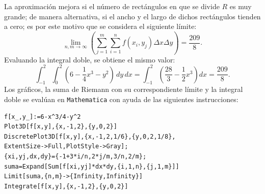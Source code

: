 \begin{ejemplo}
  La aproximación mejora si el número de rectángulos en que se divide $R$ es muy grande; de manera alternativa, si el ancho y el largo de dichos rectángulos tienden a cero; es por este motivo que se considera el siguiente límite:
  \[
    \lim_{n,m\to \infty }\left(\sum_{j=1}^{m}\sum_{i=1}^{n}f\left( x_{i},y_{j}\right) \Delta x\Delta y\right) = \frac{209}{8}.
  \]
  Evaluando la integral doble, se obtiene el mismo valor:
  \[
    \int_{-1}^{2}\int_{0}^{2}\left( 6-\frac{1}{4}x^{3}-y^{2}\right) \,dy\,dx
    =\int_{-1}^{2}\left( \frac{28}{3}-\frac{1}{2}x^{3}\right) dx= \frac{209}{8}.
  \]
  Los gráficos, la suma de Riemann con su correspondiente límite y la integral doble se evalúan en \verb"Mathematica" con ayuda de las siguientes instrucciones:
\end{ejemplo}

\begin{tcolorbox}[title=\bf Instrucción \verb"Mathematica"]\begin{Verbatim}[formatcom=\letraverbatim]
f[x_,y_]:=6-x^3/4-y^2
Plot3D[f[x,y],{x,-1,2},{y,0,2}]
DiscretePlot3D[f[x,y],{x,-1,2,1/6},{y,0,2,1/8},
ExtentSize->Full,PlotStyle->Gray];
{xi,yj,dx,dy}={-1+3*i/n,2*j/m,3/n,2/m};
suma=Expand[Sum[f[xi,yj]*dx*dy,{i,1,n},{j,1,m}]]
Limit[suma,{n,m}->{Infinity,Infinity}]
Integrate[f[x,y],{x,-1,2},{y,0,2}]
\end{Verbatim}
\end{tcolorbox}

